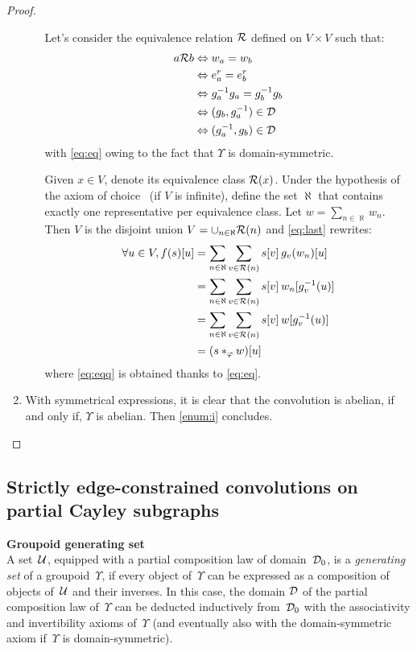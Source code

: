 \begin{proof}
\begin{enumerate}[label=(\roman*)]
\begin{enumerate}
    Let's consider the equivalence relation $\ccr$ defined on $V \times V$ such that:
    \begin{align}
    a \ccr b & \Leftrightarrow    w_a = w_b\nonumber\\
            & \Leftrightarrow e^r_a = e^r_b\nonumber\\
            & \Leftrightarrow g_a^{-1}g_a = g_b^{-1}g_b\nonumber\\
            & \Leftrightarrow (g_b, g_a^{-1}) \in \cd\nonumber\\
            & \Leftrightarrow (g_a^{-1}, g_b) \in \cd \label{eq:eq}
    \end{align}
    with \eqref{eq:eq} owing to the fact that $\Upsilon$ is domain-symmetric.

    Given $x\in V$, denote its equivalence class $\ccr(x)$. Under the hypothesis of the axiom of choice~\citep{zermelo1904beweis} (if $V$ is infinite), define the set $\aleph$ that contains exactly one representative per equivalence class. Let $w = \sum_{n \in \aleph} w_n$. Then $V$ is the disjoint union $V = \displaystyle\cup_{n \in \aleph} \ccr(n)$ and \eqref{eq:last} rewrites:
    \begin{align}
    \forall u \in V, f(s)[u] & = \displaystyle\sum_{n \in \aleph}\sum_{v \in \ccr(n)} s[v] \h{2} g_v(w_n)[u]\nonumber\\
    	 				  & = \displaystyle\sum_{n \in \aleph}\sum_{v \in \ccr(n)} s[v] \h{2} w_n[g_v^{-1}(u)]\nonumber\\
    	 				  & = \displaystyle\sum_{n \in \aleph}\sum_{v \in \ccr(n)} s[v] \h{2} w[g_v^{-1}(u)]\label{eq:eqq}\\
    	 				  & = (s \ast_\varphi w)[u]\nonumber
    \end{align}
    where \eqref{eq:eqq} is obtained thanks to \eqref{eq:eq}.
  \end{enumerate}

  \item With symmetrical expressions, it is clear that the convolution is abelian, if and only if, $\Upsilon$ is abelian. Then \ref{enum:i} concludes.
\end{enumerate}
\end{proof}

\subsection{Strictly edge-constrained convolutions on partial Cayley subgraphs}

\begin{definition}\textbf{Groupoid generating set}\\
A set~$\cu$, equipped with a partial composition law of domain~$\cd_0$, is a \emph{generating set} of a groupoid~$\Upsilon$, if every object of~$\Upsilon$ can be expressed as a composition of objects of~$\cu$ and their inverses. In this case, the domain $\cd$ of the partial composition law of~$\Upsilon$ can be deducted inductively from~$\cd_0$ with the associativity and invertibility axioms of~$\Upsilon$ (and eventually also with the domain-symmetric axiom if~$\Upsilon$ is domain-symmetric).
\end{definition}

